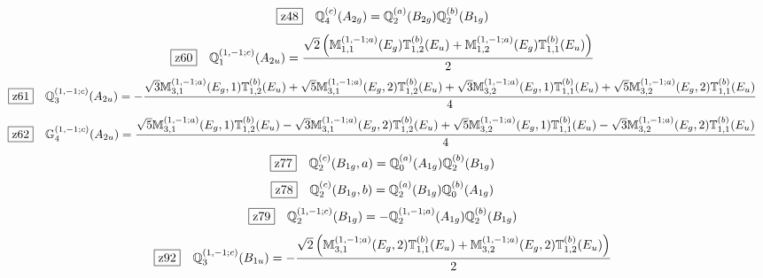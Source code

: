 \documentclass[fleqn,10pt,landscape]{jsarticle}
\begin{document}
\begin{dmath*}
\hspace*{3mm}\fbox{z48}\quad \mathbb{Q}_{4}^{(c)}(A_{2g})=\mathbb{Q}_{2}^{(a)}(B_{2g}) \mathbb{Q}_{2}^{(b)}(B_{1g})
\end{dmath*}
\begin{dmath*}
\hspace*{3mm}\fbox{z60}\quad \mathbb{Q}_{1}^{(1,-1;c)}(A_{2u})=\frac{\sqrt{2} \left(\mathbb{M}_{1,1}^{(1,-1;a)}(E_{g}) \mathbb{T}_{1,2}^{(b)}(E_{u}) + \mathbb{M}_{1,2}^{(1,-1;a)}(E_{g}) \mathbb{T}_{1,1}^{(b)}(E_{u})\right)}{2}
\end{dmath*}
\begin{dmath*}
\hspace*{3mm}\fbox{z61}\quad \mathbb{Q}_{3}^{(1,-1;c)}(A_{2u})=- \frac{\sqrt{3} \mathbb{M}_{3,1}^{(1,-1;a)}(E_{g},1) \mathbb{T}_{1,2}^{(b)}(E_{u}) + \sqrt{5} \mathbb{M}_{3,1}^{(1,-1;a)}(E_{g},2) \mathbb{T}_{1,2}^{(b)}(E_{u}) + \sqrt{3} \mathbb{M}_{3,2}^{(1,-1;a)}(E_{g},1) \mathbb{T}_{1,1}^{(b)}(E_{u}) + \sqrt{5} \mathbb{M}_{3,2}^{(1,-1;a)}(E_{g},2) \mathbb{T}_{1,1}^{(b)}(E_{u})}{4}
\end{dmath*}
\begin{dmath*}
\hspace*{3mm}\fbox{z62}\quad \mathbb{G}_{4}^{(1,-1;c)}(A_{2u})=\frac{\sqrt{5} \mathbb{M}_{3,1}^{(1,-1;a)}(E_{g},1) \mathbb{T}_{1,2}^{(b)}(E_{u}) - \sqrt{3} \mathbb{M}_{3,1}^{(1,-1;a)}(E_{g},2) \mathbb{T}_{1,2}^{(b)}(E_{u}) + \sqrt{5} \mathbb{M}_{3,2}^{(1,-1;a)}(E_{g},1) \mathbb{T}_{1,1}^{(b)}(E_{u}) - \sqrt{3} \mathbb{M}_{3,2}^{(1,-1;a)}(E_{g},2) \mathbb{T}_{1,1}^{(b)}(E_{u})}{4}
\end{dmath*}
\begin{dmath*}
\hspace*{3mm}\fbox{z77}\quad \mathbb{Q}_{2}^{(c)}(B_{1g},a)=\mathbb{Q}_{0}^{(a)}(A_{1g}) \mathbb{Q}_{2}^{(b)}(B_{1g})
\end{dmath*}
\begin{dmath*}
\hspace*{3mm}\fbox{z78}\quad \mathbb{Q}_{2}^{(c)}(B_{1g},b)=\mathbb{Q}_{2}^{(a)}(B_{1g}) \mathbb{Q}_{0}^{(b)}(A_{1g})
\end{dmath*}
\begin{dmath*}
\hspace*{3mm}\fbox{z79}\quad \mathbb{Q}_{2}^{(1,-1;c)}(B_{1g})=- \mathbb{Q}_{2}^{(1,-1;a)}(A_{1g}) \mathbb{Q}_{2}^{(b)}(B_{1g})
\end{dmath*}
\begin{dmath*}
\hspace*{3mm}\fbox{z92}\quad \mathbb{Q}_{3}^{(1,-1;c)}(B_{1u})=- \frac{\sqrt{2} \left(\mathbb{M}_{3,1}^{(1,-1;a)}(E_{g},2) \mathbb{T}_{1,1}^{(b)}(E_{u}) + \mathbb{M}_{3,2}^{(1,-1;a)}(E_{g},2) \mathbb{T}_{1,2}^{(b)}(E_{u})\right)}{2}
\end{dmath*}
\end{document}

